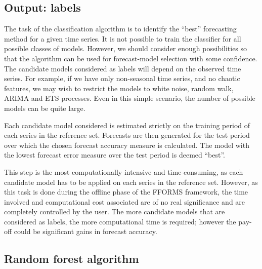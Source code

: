 \documentclass[11pt,a4paper,]{article}
\begin{document}
\subsection{Output: labels}\label{output-labels}

The task of the classification algorithm is to identify the ``best''
forecasting method for a given time series. It is not possible to train
the classifier for all possible classes of models. However, we should
consider enough possibilities so that the algorithm can be used for
forecast-model selection with some confidence. The candidate models
considered as labels will depend on the observed time series. For
example, if we have only non-seasonal time series, and no chaotic
features, we may wish to restrict the models to white noise, random
walk, ARIMA and ETS processes. Even in this simple scenario, the number
of possible models can be quite large.

Each candidate model considered is estimated strictly on the training
period of each series in the reference set. Forecasts are then generated
for the test period over which the chosen forecast accuracy measure is
calculated. The model with the lowest forecast error measure over the
test period is deemed ``best''.

This step is the most computationally intensive and time-consuming, as
each candidate model has to be applied on each series in the reference
set. However, as this task is done during the offline phase of the
FFORMS framework, the time involved and computational cost associated
are of no real significance and are completely controlled by the user.
The more candidate models that are considered as labels, the more
computational time is required; however the pay-off could be significant
gains in forecast accuracy.

\subsection{Random forest algorithm}\label{random-forest-algorithm}
\end{document}
